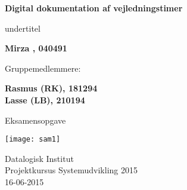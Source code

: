\begin{titlepage}
    \begin{center}
        \vspace*{1cm}

        \Huge
        \textbf{Digital dokumentation af vejledningstimer}

        \vspace{0.5cm}
        \LARGE
        undertitel

        \vspace{1.5cm}

        \textbf{Mirza , 040491}\\
        
        \vspace{1.5cm}
        
        Gruppemedlemmere:\\
        
        \vspace{0.5cm}
        
        \textbf{Rasmus (RK), 181294}\\
        \textbf{Lasse (LB), 210194}

        \vfill

        Eksamensopgave

        \vspace{0.8cm}

        \texttt{[image: sam1]}

        \Large
        Datalogisk Institut\\
        Projektkursus Systemudvikling 2015\\
        16-06-2015

    \end{center}
\end{titlepage} 
